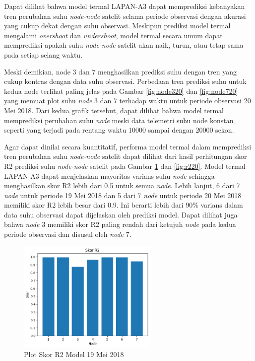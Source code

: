Dapat dilihat bahwa model termal LAPAN-A3 dapat memprediksi kebanyakan tren
perubahan suhu \textit{node-node} satelit selama periode observasi dengan akurasi yang
cukup dekat dengan suhu observasi. Meskipun prediksi model termal mengalami
\textit{overshoot} dan \textit{undershoot}, model termal secara umum dapat
memprediksi apakah suhu \textit{node-node} satelit akan naik, turun, atau tetap sama
pada setiap selang waktu.

Meski demikian, node 3 dan 7 menghasilkan prediksi suhu
dengan tren yang cukup kontras dengan data suhu observasi. Perbedaan tren
prediksi suhu untuk kedua node terlihat paling jelas pada Gambar \ref{fig:node320}
dan \ref{fig:node720} yang memuat plot suhu \textit{node} 3 dan 7 terhadap waktu untuk
periode observasi 20 Mei 2018. Dari kedua grafik tersebut, dapat dilihat bahwa
model termal memprediksi perubahan suhu \textit{node} meski data telemetri suhu node
konstan seperti yang terjadi pada rentang waktu 10000 sampai dengan 20000
sekon.

Agar dapat dinilai secara kuantitatif, performa model termal dalam memprediksi
tren perubahan suhu \textit{node-node} satelit dapat dilihat dari hasil perhitungan skor
R2 prediksi suhu \textit{node-node} satelit pada Gambar \ref{fig:r219} dan
\ref{fig:r220}. Model termal LAPAN-A3 dapat menjelaskan mayoritas varians suhu
\textit{node} sehingga menghasilkan skor R2 lebih dari 0.5 untuk semua \textit{node}. Lebih
lanjut, 6 dari 7 \textit{node} untuk periode 19 Mei 2018 dan 5 dari 7 \textit{node} untuk periode
20 Mei 2018 memiliki skor R2 lebih besar dari 0.9. Ini berarti lebih dari 90\%
varians dalam data suhu observasi dapat dijelaskan oleh prediksi model. Dapat
dilihat juga bahwa \textit{node} 3 memiliki skor R2 paling rendah dari ketujuh \textit{node} pada
kedua periode observasi dan disusul oleh \textit{node} 7.

\begin{figure}[H]
\setlength{}
\begin{center}
\includegraphics[width=0.6\textwidth]{fig/r2_2018-05-19.png}
\caption{Plot Skor R2 Model 19 Mei 2018}
\label{fig:r219}
\end{center}
\end{figure}

